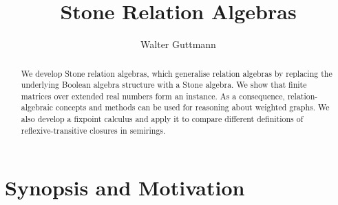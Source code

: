 \documentclass[11pt,a4paper]{article}
\begin{document}
\title{Stone Relation Algebras}
\author{Walter Guttmann}
\maketitle

\begin{abstract}
  We develop Stone relation algebras, which generalise relation algebras by replacing the underlying Boolean algebra structure with a Stone algebra.
  We show that finite matrices over extended real numbers form an instance.
  As a consequence, relation-algebraic concepts and methods can be used for reasoning about weighted graphs.
  We also develop a fixpoint calculus and apply it to compare different definitions of reflexive-transitive closures in semirings.
\end{abstract}

\tableofcontents

\section{Synopsis and Motivation}
\end{document}
